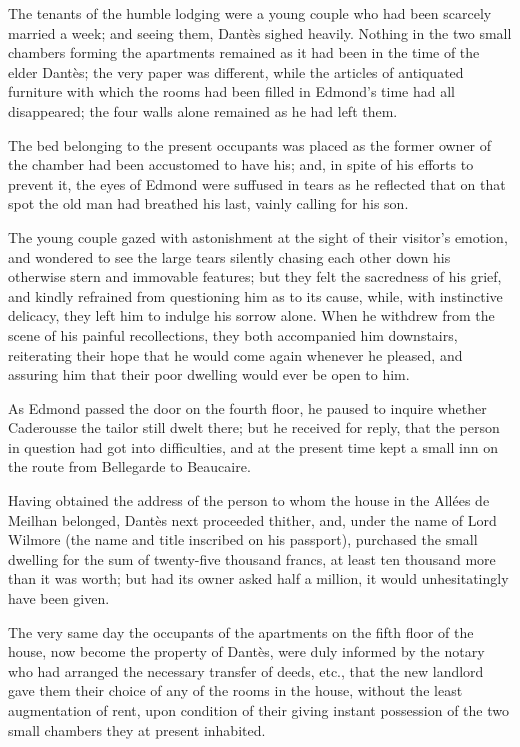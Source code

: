  The tenants of the humble lodging were a young couple who had been scarcely married a week; and seeing them, Dantès sighed heavily. Nothing in the two small chambers forming the apartments remained as it had been in the time of the elder Dantès; the very paper was different, while the articles of antiquated furniture with which the rooms had been filled in Edmond's time had all disappeared; the four walls alone remained as he had left them. 

 The bed belonging to the present occupants was placed as the former owner of the chamber had been accustomed to have his; and, in spite of his efforts to prevent it, the eyes of Edmond were suffused in tears as he reflected that on that spot the old man had breathed his last, vainly calling for his son. 

 The young couple gazed with astonishment at the sight of their visitor's emotion, and wondered to see the large tears silently chasing each other down his otherwise stern and immovable features; but they felt the sacredness of his grief, and kindly refrained from questioning him as to its cause, while, with instinctive delicacy, they left him to indulge his sorrow alone.  When he withdrew from the scene of his painful recollections, they both accompanied him downstairs, reiterating their hope that he would come again whenever he pleased, and assuring him that their poor dwelling would ever be open to him. 

 As Edmond passed the door on the fourth floor, he paused to inquire whether Caderousse the tailor still dwelt there; but he received for reply, that the person in question had got into difficulties, and at the present time kept a small inn on the route from Bellegarde to Beaucaire. 

 Having obtained the address of the person to whom the house in the Allées de Meilhan belonged, Dantès next proceeded thither, and, under the name of Lord Wilmore (the name and title inscribed on his passport), purchased the small dwelling for the sum of twenty-five thousand francs, at least ten thousand more than it was worth; but had its owner asked half a million, it would unhesitatingly have been given. 

 The very same day the occupants of the apartments on the fifth floor of the house, now become the property of Dantès, were duly informed by the notary who had arranged the necessary transfer of deeds, etc., that the new landlord gave them their choice of any of the rooms in the house, without the least augmentation of rent, upon condition of their giving instant possession of the two small chambers they at present inhabited. 

